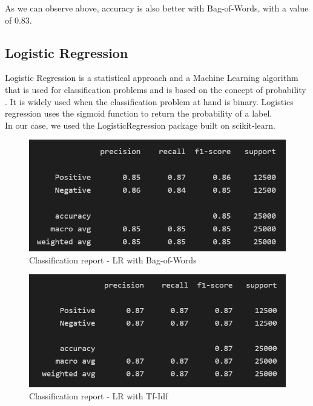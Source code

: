 \documentclass[fleqn,10pt]{SelfArx} %
\begin{document}
As we can observe above, accuracy is also better with Bag-of-Words, with a value of 0.83.

\subsection{Logistic Regression}
Logistic Regression is a statistical approach and a Machine Learning algorithm that is used for classification problems and is based on the concept of probability \cite{LR}. It is widely used when the classification problem at hand is binary. Logistics regression uses the sigmoid function to return the probability of a label.\\
In our case, we used the LogisticRegression package built on scikit-learn.

\begin{figure}[H]
\begin{center}
  \includegraphics[scale=0.6]{./images/LR_BoW.png}
\end{center}
  \caption{Classification report - LR with Bag-of-Words}
\end{figure}

\begin{figure}[H]
\begin{center}
  \includegraphics[scale=0.6]{./images/LR_TFIDF.png}
\end{center}
  \caption{Classification report - LR with Tf-Idf}
\end{figure}
\end{document}
